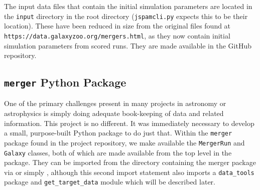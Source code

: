 The input data files that contain the initial simulation
parameters are located in the \texttt{input} directory in the root directory
(\texttt{jspamcli.py} expects this to be their location).
These have been reduced in size from the
original files found at \texttt{https://data.galaxyzoo.org/mergers.html}, as
they now contain initial simulation parameters from scored runs. They are made
available in the GitHub repository.



\subsection{\texttt{merger} Python Package}
One of the primary challenges present in many projects in astronomy or
astrophysics is simply doing adequate book-keeping of data and related
information. This project is no different.
It was immediately necessary to develop a small,
purpose-built Python package to do just that. Within the \texttt{merger} package
found in the project repository, we make available the \texttt{MergerRun} and
\texttt{Galaxy} classes,
both of which are made available from the top level in the package. They can be
imported from the directory containing the merger package via
 or simply
, although this second import statement also
imports a \texttt{data\_tools} package and \texttt{get\_target\_data} module which
will be described later.

